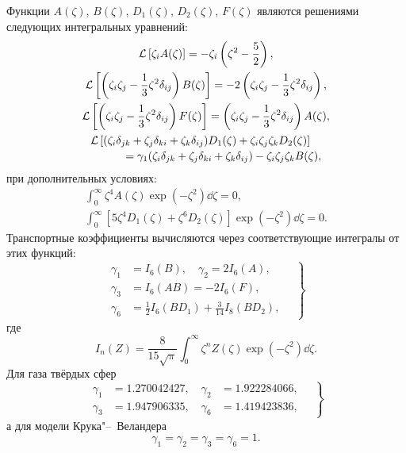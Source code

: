 Функции \(A(\zeta)\), \(B(\zeta)\), \(D_1(\zeta)\), \(D_2(\zeta)\), \(F(\zeta)\)
являются решениями следующих интегральных уравнений:
\begin{gather}
    \mathcal{L}\left[\Z A(\zeta)\right] = -\Z \left(\zeta^2-\frac52\right), \label{eq:gh:A}\\
    \mathcal{L}\left[\left(\ZZ-\frac13\zeta^2\delta_{ij}\right)B(\zeta)\right] =
        -2\left(\ZZ-\frac13\zeta^2\delta_{ij}\right), \label{eq:gh:B}\\
    \mathcal{L}\left[\left(\ZZ-\frac13\zeta^2\delta_{ij}\right)F(\zeta)\right] =
        \left(\ZZ-\frac13\zeta^2\delta_{ij}\right)A(\zeta), \label{eq:gh:F}\\
    \begin{multlined}
        \mathcal{L}\left[(\ZD{i}{jk}+\ZD{j}{ki}+\ZD{k}{ij})D_1(\zeta) + \ZZZ D_2(\zeta)\right] \\
            = \gamma_1(\ZD{i}{jk}+\ZD{j}{ki}+\ZD{k}{ij}) - \ZZZ B(\zeta),
    \end{multlined}\label{eq:gh:D}
\end{gather}
при дополнительных условиях:
\begin{gather}
    \int_0^\infty \zeta^4 A(\zeta)\exp(-\zeta^2)\dd\zeta = 0, \\
    \int_0^\infty \left[ 5\zeta^4 D_1(\zeta) + \zeta^6 D_2(\zeta) \right]\exp(-\zeta^2)\dd\zeta = 0.
\end{gather}
Транспортные коэффициенты вычисляются через соответствующие интегралы от этих функций:
\begin{equation}\label{eq:gh:gammas}
    \left.\begin{aligned}
        \gamma_1 &= I_6(B), \quad \gamma_2 = 2I_6(A), \\
        \gamma_3 &= I_6(AB) = -2I_6(F), \\
        \gamma_6 &= \frac12 I_6(BD_1) + \frac{3}{14} I_8(BD_2),
    \end{aligned}\quad\right\}
\end{equation}
где
\begin{equation}\label{eq:gh:I_Z}
    I_n(Z) = \frac{8}{15\sqrt\pi}\int_0^\infty \zeta^n Z(\zeta) \exp(-\zeta^2)\dd\zeta.
\end{equation}
Для газа твёрдых сфер
\begin{equation}\label{eq:gh:gammas_hs}
    \left.\begin{aligned}
        \gamma_1 &= 1.270042427, \quad \gamma_2 &= 1.922284066, \\
        \gamma_3 &= 1.947906335, \quad \gamma_6 &= 1.419423836,
    \end{aligned}\quad\right\}
\end{equation}
а для модели Крука"--~Веландера
\begin{equation}\label{eq:gh:gammas_bgk}
    \gamma_1 = \gamma_2 = \gamma_3 = \gamma_6 = 1.
\end{equation}

